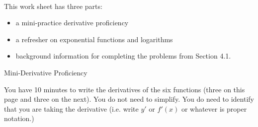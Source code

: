 \documentclass[11pt,fleqn]{article}
\begin{document}
\renewcommand{\headrulewidth}{0pt}
\newcommand{\blank}[1]{\rule{#1}{0.75pt}}
\newcommand{\bc}{\begin{center}}
\newcommand{\ec}{\end{center}}
\renewcommand{\d}{\displaystyle}

\vspace*{-0.7in}

\begin{center}
  \large
  \\ 
\end{center}
 This work sheet has three parts:
 \begin{itemize}
 \item a mini-practice derivative proficiency
 \item a refresher on exponential functions and logarithms
 \item background information for completing the problems from Section 4.1.
 \end{itemize}
  
 
 \begin{center} Mini-Derivative Proficiency \end{center}
You have 10 minutes to write the derivatives of the six functions (three on this page and three on the next). You do not need to simplify. You do need to identify that you are taking the derivative (i.e. write $y'$ or $f'(x)$ or whatever is proper notation.)
\end{document}
